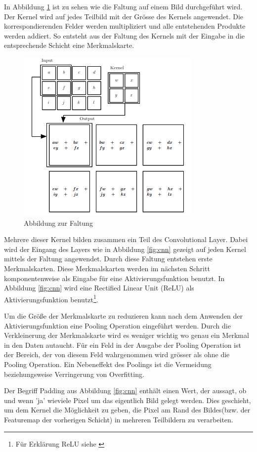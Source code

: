 In Abbildung \ref{fig:faltung} ist zu sehen wie die Faltung auf einem Bild durchgeführt wird. Der Kernel wird auf jedes Teilbild mit der Grösse des Kernels angewendet. Die korrespondierenden Felder werden multipliziert und alle entstehenden Produkte werden addiert. So entsteht aus der Faltung des Kernels mit der Eingabe in die entsprechende Schicht eine Merkmalskarte.
\begin{figure}[H]
 \centering
 \includegraphics[width=0.45 \textwidth,keepaspectratio=true]{images/convolution.png}
 \caption{Abbildung zur Faltung \cite{CNNBook}}
 \label{fig:faltung}
\end{figure}
Mehrere dieser Kernel bilden zusammen ein Teil des Convolutional Layer. Dabei wird der Eingang des Layers wie in Abbildung \ref{fig:cnn} gezeigt auf jeden Kernel mittels der Faltung angewendet. Durch diese Faltung entstehen erste Merkmalskarten. Diese Merkmalskarten werden im nächsten Schritt komponentenweise als Eingabe für eine Aktivierungsfunktion benutzt. In Abbildung \ref{fig:cnn} wird eine Rectified Linear Unit (ReLU) als Aktivierungsfunktion benutzt\footnote{Für Erklärung ReLU siehe \cite{neural}}.



Um die Größe der Merkmalskarte zu reduzieren kann nach dem Anwenden der Aktivierungsfunktion eine Pooling Operation eingeführt werden. Durch die Verkleinerung der Merkmalskarte wird es weniger wichtig wo genau ein Merkmal in den Daten autaucht. Für ein Feld in der Ausgabe der Pooling Operation ist der Bereich, der von diesem Feld wahrgenommen wird grösser als ohne die Pooling Operation. Ein Nebeneffekt des Poolings ist die Vermeidung beziehungsweise Verringerung von Overfitting. 


Der Begriff Padding aus Abbildung \ref{fig:cnn} enthält einen Wert, der aussagt, ob und wenn 'ja' wieviele Pixel um das eigentlich Bild gelegt werden. Dies geschieht, um dem Kernel die Möglichkeit zu geben, die Pixel am Rand des Bildes(bzw. der Featuremap der vorherigen Schicht) in mehreren Teilbildern zu verarbeiten.



